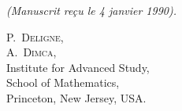 \documentclass[12pt,a4paper]{article}
\theoremstyle{plain}
\theoremstyle{definition}
\begin{document}
\vfill

\begin{flushright}
\textit{(Manuscrit reçu le 4 janvier 1990).}
\end{flushright}

\begin{center}
\textsc{P.\ Deligne,}\\
\textsc{A.\ Dimca,}\\
Institute for Advanced Study,\\
School of Mathematics,\\
Princeton, New Jersey, USA.
\end{center}
\end{document}
